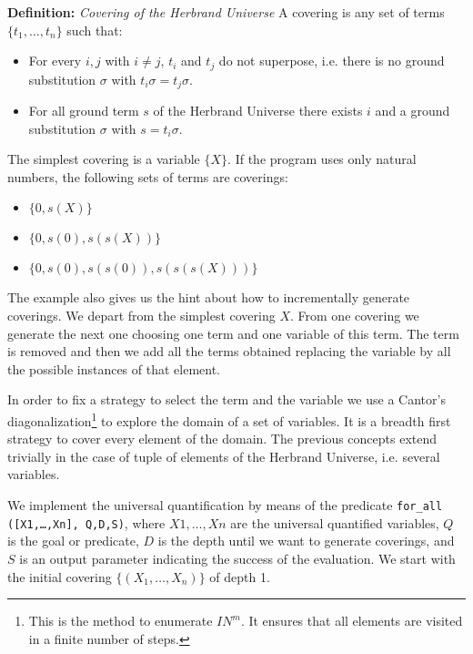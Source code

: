 \documentclass[]{llncs}
\newcommand{\N}{I\!\!N}
\begin{document}
\smallskip
\noindent
{\bf Definition:} {\em Covering of the Herbrand Universe}
\noindent
A covering is any set of terms $\{t_1, \ldots, t_n\}$ such
that:
\begin{itemize}
\item For every $i, j$ with $i \neq j$, $t_i$ and $t_j$ do
not superpose, i.e. there is no ground substitution $\sigma$
with $t_i\sigma = t_j\sigma$.
\item For all ground term $s$ of the Herbrand Universe there
exists $i$ and a ground substitution $\sigma$ with
$s = t_i\sigma$.
\end{itemize}
The simplest covering is a variable $\{X\}$. If the program
uses only natural numbers, the following sets of terms are
coverings:
\begin{itemize}
\item $\{0, s (X)\}$
\item $\{0, s (0), s(s(X))\}$
\item $\{0, s (0), s(s(0)), s(s(s(X)))\}$
\end{itemize}

The example also gives us the hint about how to
incrementally generate coverings. We depart from the simplest
covering $X$. From one covering we generate the next one
choosing one term and one variable of this term. The term is
removed and then we add all the terms obtained replacing the
variable by all the possible instances of that element.

In order to fix a strategy to select the term and the variable
we use a Cantor's diagonalization\footnote{This is the method
to enumerate $\N^m$. It ensures that all elements are visited in
a finite number of steps.} to explore the domain of a
set of variables. It is a breadth first strategy to cover
every element of the domain. The previous concepts extend
trivially in the case of tuple of elements of the
Herbrand Universe, i.e. several variables.

We implement the universal quantification by means of the
predicate \linebreak
{\tt for\_all ([X1,\ldots,Xn], Q,D,S)}, where $X1,\ldots,Xn$ are the
universal quantified variables, $Q$ is the goal or predicate, $D$ is
the depth until we want to generate coverings, and $S$ is an output
parameter indicating the success of the evaluation. We start with the
initial covering $\{(X_1,\ldots,X_n)\}$ of depth 1.
\end{document}
